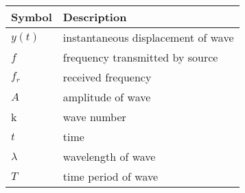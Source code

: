 \begin{tabular}{ | m{1.0cm} | m{4cm} | } 
  \hline
 Symbol & Description \\ 
 \hline
 $y(t)$ & instantaneous displacement of wave \\
 \hline
$f $& frequency transmitted by source \\
\hline
$f_r $& received frequency \\
\hline
$A$ & amplitude of wave \\ 
\hline
 k & wave number \\
\hline
$t $& time  \\
\hline
$\lambda $& wavelength of wave \\
\hline
$T $& time period of wave \\
\hline
\end{tabular}\\
\caption{}
\label{Table:1}